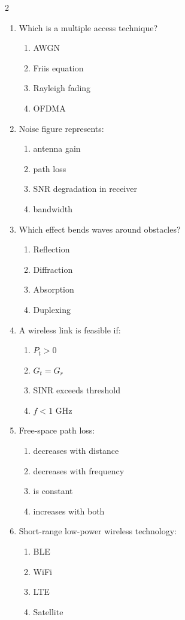 \begin{multicols}{2}
\begin{enumerate}[leftmargin=*, itemsep=0.4em]
\item Which is a multiple access technique?
\begin{enumerate}[label=\alph*)]
\item AWGN
\item Friis equation
\item Rayleigh fading
\item OFDMA
\end{enumerate}

\item Noise figure represents:
\begin{enumerate}[label=\alph*)]
\item antenna gain
\item path loss
\item SNR degradation in receiver
\item bandwidth
\end{enumerate}

\item Which effect bends waves around obstacles?
\begin{enumerate}[label=\alph*)]
\item Reflection
\item Diffraction
\item Absorption
\item Duplexing
\end{enumerate}

\item A wireless link is feasible if:
\begin{enumerate}[label=\alph*)]
\item $P_t > 0$
\item $G_t = G_r$
\item SINR exceeds threshold
\item $f < 1$ GHz
\end{enumerate}

\item Free-space path loss:
\begin{enumerate}[label=\alph*)]
\item decreases with distance
\item decreases with frequency
\item is constant
\item increases with both
\end{enumerate}

\item Short-range low-power wireless technology:
\begin{enumerate}[label=\alph*)]
\item BLE
\item WiFi
\item LTE
\item Satellite
\end{enumerate}


\end{enumerate}
\end{multicols}
